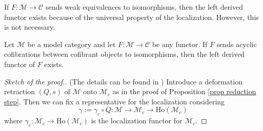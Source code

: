 \begin{refsection}
\begin{rmk}
If $F \colon \mathcal M \to \mathcal C$ sends weak equivalences to isomorphisms, then the left derived functor exists because of the universal property of the localization. However, this is not necessary. %
\end{rmk}

\begin{thm} \label{thm existence derived functor}
Let $\mathcal M$ be a model category and let $F \colon \mathcal M \to \mathcal C$ be any functor. If $F$ sends acyclic cofibrations between cofibrant objects to isomorphisms, then the left derived functor of $F$ exists.
\end{thm}

\begin{proof}[Sketch of the proof.] (The details can be found in \cite[Theorem 2.2.8]{riehl}) Introduce a deformation retraction $(Q,s)$ of $\mathcal M$ onto $\mathcal M_c$ as in the proof of Proposition \ref{prop reduction step}. Then we can fix a representative for the localization considering
\[
\gamma := \gamma_c \circ Q \colon \mathcal M \to \mathcal M_c \to \mathrm{Ho}(\mathcal M_c)
\]
where $\gamma_c \colon \mathcal M_c \to \mathrm{Ho}(\mathcal M_c)$ is the localization functor for $\mathcal M_c$.


\end{proof}
\end{refsection}
